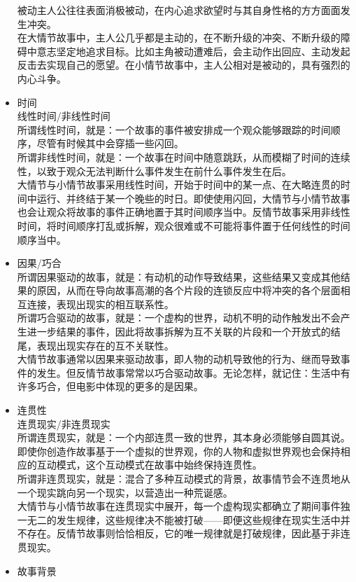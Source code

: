 \documentclass[UTF8,9pt]{ctexart}
\begin{document}
\begin{itemize}
    被动主人公往往表面消极被动，在内心追求欲望时与其自身性格的方方面面发生冲突。\\
    在大情节故事中，主人公几乎都是主动的，在不断升级的冲突、不断升级的障碍中意志坚定地追求目标。比如主角被动遭难后，会主动作出回应、主动发起反击去实现自己的愿望。在小情节故事中，主人公相对是被动的，具有强烈的内心斗争。
\item 时间\\
    线性时间/非线性时间\\
    所谓线性时间，就是：一个故事的事件被安排成一个观众能够跟踪的时间顺序，尽管有时候其中会穿插一些闪回。\\
    所谓非线性时间，就是：一个故事在时间中随意跳跃，从而模糊了时间的连续性，以致于观众无法判断什么事件发生在前什么事件发生在后。\\
    大情节与小情节故事采用线性时间，开始于时间中的某一点、在大略连贯的时间中运行、并终结于某一个晚些的时日。即使使用闪回，大情节与小情节故事也会让观众将故事的事件正确地置于其时间顺序当中。反情节故事采用非线性时间，将时间顺序打乱或拆解，观众很难或不可能将事件置于任何线性的时间顺序当中。
\item 因果/巧合\\
    所谓因果驱动的故事，就是：有动机的动作导致结果，这些结果又变成其他结果的原因，从而在导向故事高潮的各个片段的连锁反应中将冲突的各个层面相互连接，表现出现实的相互联系性。\\
    所谓巧合驱动的故事，就是：一个虚构的世界，动机不明的动作触发出不会产生进一步结果的事件，因此将故事拆解为互不关联的片段和一个开放式的结尾，表现出现实存在的互不关联性。\\
    大情节故事通常以因果来驱动故事，即人物的动机导致他的行为、继而导致事件的发生。但反情节故事常常以巧合驱动故事。无论怎样，就记住：生活中有许多巧合，但电影中体现的更多的是因果。
\item 连贯性\\
    连贯现实/非连贯现实\\
    所谓连贯现实，就是：一个内部连贯一致的世界，其本身必须能够自圆其说。即使你创造作故事基于一个虚拟的世界观，你的人物和虚拟世界观也会保持相应的互动模式，这个互动模式在故事中始终保持连贯性。\\
    所谓非连贯现实，就是：混合了多种互动模式的背景，故事情节会不连贯地从一个现实跳向另一个现实，以营造出一种荒诞感。\\
    大情节与小情节故事在连贯现实中展开，每一个虚构现实都确立了期间事件独一无二的发生规律，这些规律决不能被打破——即便这些规律在现实生活中并不存在。反情节故事则恰恰相反，它的唯一规律就是打破规律，因此基于非连贯现实。
\item 故事背景\\

\end{itemize}
\end{document}
